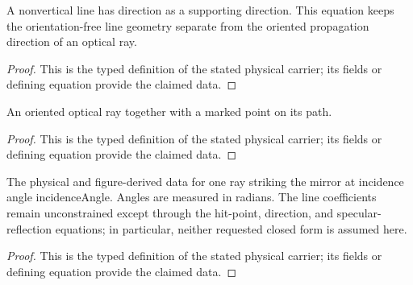\begin{definition}
  \label{def:physics:IPhO_2026_2_C_1:aux012}
  A nonvertical line has direction as a supporting direction. This equation keeps the orientation-free line geometry separate from the oriented propagation direction of an optical ray.
\end{definition}
\begin{proof}
  This is the typed definition of the stated physical carrier; its fields or defining equation provide the claimed data.
\end{proof}

\begin{definition}
  \label{def:physics:IPhO_2026_2_C_1:aux013}
  An oriented optical ray together with a marked point on its path.
\end{definition}
\begin{proof}
  This is the typed definition of the stated physical carrier; its fields or defining equation provide the claimed data.
\end{proof}

\begin{definition}
  \label{def:physics:IPhO_2026_2_C_1:aux014}
  The physical and figure-derived data for one ray striking the mirror at incidence angle incidenceAngle. Angles are measured in radians. The line coefficients remain unconstrained except through the hit-point, direction, and specular-reflection equations; in particular, neither requested closed form is assumed here.
\end{definition}
\begin{proof}
  This is the typed definition of the stated physical carrier; its fields or defining equation provide the claimed data.
\end{proof}

